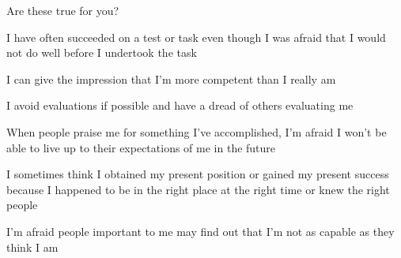 \documentclass[aspectratio=169]{beamer}
\begin{document}
\begin{frame}
  \begin{center}
    \Huge Are these true for you?
    \\ \small \cite{clance85}
  \end{center}
\end{frame}

\begin{frame}
  \begin{center}
    \Huge  I have often succeeded on a test or task even though I was afraid that I would not do well before I undertook the task
  \end{center}
\end{frame}

\begin{frame}
  \begin{center}
    \Huge  I can give the impression that I’m more competent than I really am
  \end{center}
\end{frame}

\begin{frame}
  \begin{center}
    \Huge  I avoid evaluations if possible and have a dread of others evaluating me
  \end{center}
\end{frame}

\begin{frame}
  \begin{center}
    \Huge  When  people  praise  me  for  something  I’ve  accomplished,  I’m  afraid  I  won’t  be able to live up to their expectations of me in the future
  \end{center}
\end{frame}

\begin{frame}
  \begin{center}
    \Huge  I sometimes think I obtained my present position or gained my present success because I happened to be in the right place at the right time or knew the right people
  \end{center}
\end{frame}

\begin{frame}
  \begin{center}
    \Huge  I’m  afraid  people  important  to  me  may  find  out  that  I’m  not  as  capable  as  they  think  I  am
  \end{center}
\end{frame}
\end{document}
